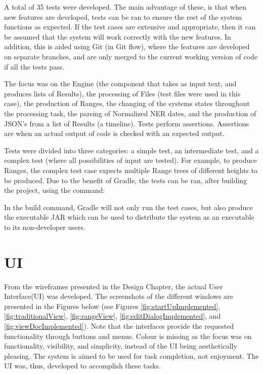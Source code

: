 \par A total of 35 tests were developed. The main advantage of these, is that when new features are developed, tests can be ran to ensure the rest of the system functions as expected. If the test cases are extensive and appropriate, then it can be assumed that the system will work correctly with the new features. In addition, this is aided using Git (in Git flow), where the features are developed on separate branches, and are only merged to the current working version of code if all the tests pass.

\par The focus was on the Engine (the component that takes as input text, and produces lists of Results), the processing of Files (test files were used in this case), the production of Ranges, the changing of the systems states throughout the processing task, the parsing of Normalized NER dates, and the production of JSON's from a list of Results (a timeline). Tests perform assertions. Assertions are when an actual output of code is checked with an expected output.

\par Tests were divided into three categories: a simple test, an intermediate test, and a complex test (where all possibilities of input are tested). For example, to produce Ranges, the complex test case expects multiple Range trees of different heights to be produced. Due to the benefit of Gradle, the tests can be ran, after building the project, using the command:\par
{}
In the build command, Gradle will not only run the test cases, but also produce the executable JAR which can be used to distribute the system as an executable to its non-developer users.

\section{UI}
\par From the wireframes presented in the Design Chapter, the actual User Interface(UI) was developed. The screenshots of the different windows are presented in the Figures below (see Figures \ref{fig:startUpImplemented}, \ref{fig:traditionalView}, \ref{fig:rangeView}, \ref{fig:editDialogImplemented}, and \ref{fig:viewDocImplemented}). Note that the interfaces provide the requested functionality through buttons and menus. Colour is missing as the focus was on functionality, visibility, and simplicity, instead of the UI being aesthetically pleasing. The system is aimed to be used for task completion, not enjoyment. The UI was, thus, developed to accomplish these tasks.

